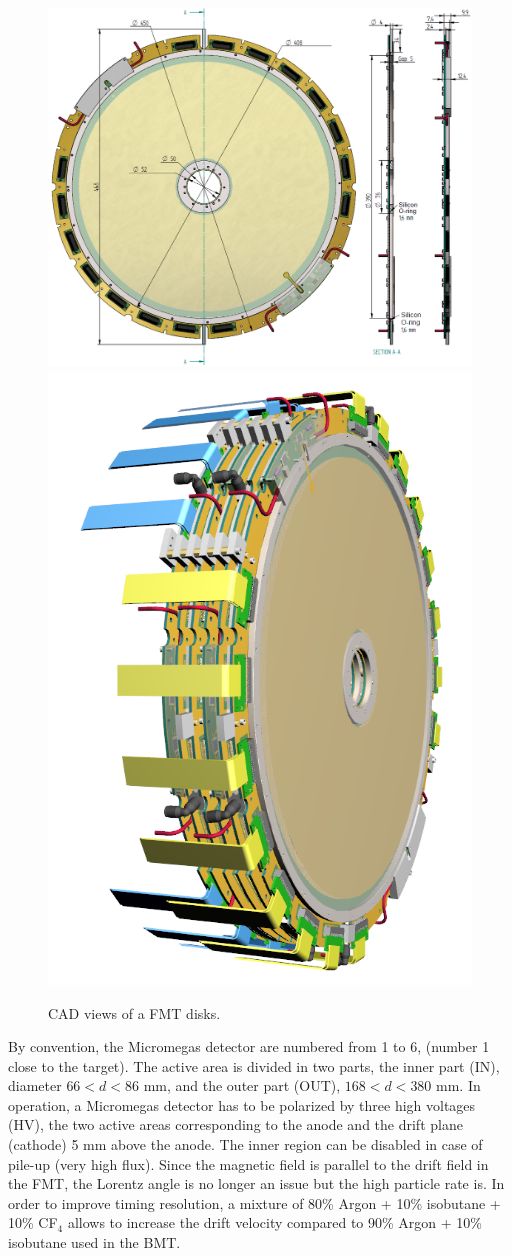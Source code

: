\begin{figure}[htb]
 
\includegraphics[width=0.66\columnwidth,keepaspectratio]{images/fig6_1}
\includegraphics[width=0.33\columnwidth,keepaspectratio]{images/fig6_2}
 \caption{CAD views of a FMT disks.}
 \label{fig:mm-fig5}
\end{figure}

By convention, the Micromegas detector are numbered from 1 to 6, (number 1 close to the target). The active area is divided in two parts, the inner part (IN),  diameter  $66 < d < 86$ mm, and the outer part (OUT), $168 < d < 380$ mm. 
In operation, a Micromegas detector has to be polarized by three high voltages (HV), the two active areas corresponding to the anode and the drift plane (cathode) 5 mm above the anode. The inner region can be disabled in case of pile-up (very high flux). Since the magnetic field is parallel to the drift field in the FMT, the Lorentz angle is no longer an issue but the high particle rate is. In order to improve timing resolution, a mixture of 80\% Argon + 10\% isobutane + 10\% CF$_4$ allows to increase the drift velocity compared to 90\% Argon + 10\% isobutane used in the BMT. 


